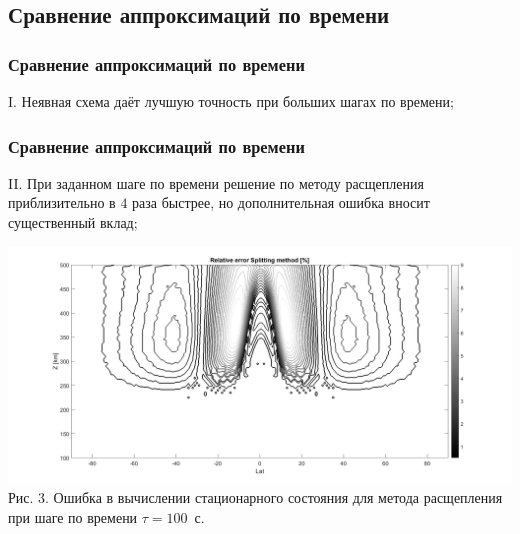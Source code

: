\documentclass[9pt, apectratio=43,unicode]{beamer}
\begin{document}
\subsection{Сравнение аппроксимаций по времени}
\begin{frame}\frametitle{Сравнение аппроксимаций по времени}
I. Неявная схема даёт лучшую точность при больших шагах по времени;

\end{frame}

\begin{frame}\frametitle{Сравнение аппроксимаций по времени}
II. При заданном шаге по времени решение по методу расщепления приблизительно в $4$ раза быстрее, но дополнительная ошибка вносит существенный вклад;

\begin{center}
\includegraphics[scale=0.18]{splitted_tau_100}\\Рис. 3. Ошибка в вычислении стационарного состояния для метода расщепления при шаге по времени $\tau = 100$~с.
\end{center}
\end{frame}
\end{document}
